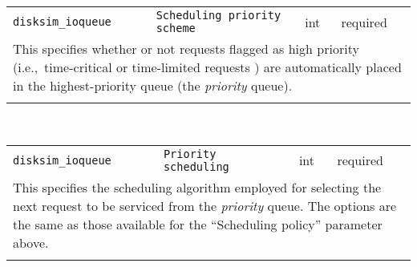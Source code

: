\noindent 
\begin{tabular}{|p{\lpmodwidth}|p{\lpnamewidth}|p{0.5in}|p{0.5in}|}
\cline{1-4}
\texttt{disksim\_ioqueue} & \texttt{Scheduling priority scheme} & int & required \\ 
\cline{1-4}
\multicolumn{4}{|p{6in}|}{
This specifies whether or not requests flagged as high priority
(i.e.,~time-critical or time-limited requests \cite{Ganger93}) are
automatically placed in the highest-priority queue (the {\it priority}
queue).
}\\ 
\cline{1-4}
\multicolumn{4}{p{5in}}{}\\
\end{tabular}\\ 
\noindent 
\begin{tabular}{|p{\lpmodwidth}|p{\lpnamewidth}|p{0.5in}|p{0.5in}|}
\cline{1-4}
\texttt{disksim\_ioqueue} & \texttt{Priority scheduling} & int & required \\ 
\cline{1-4}
\multicolumn{4}{|p{6in}|}{
This specifies the scheduling algorithm employed for selecting the next
request to be serviced from the {\it priority} queue. The options are
the same as those available for the ``Scheduling policy'' parameter
above.
}\\ 
\cline{1-4}
\multicolumn{4}{p{5in}}{}\\
\end{tabular}\\ 
